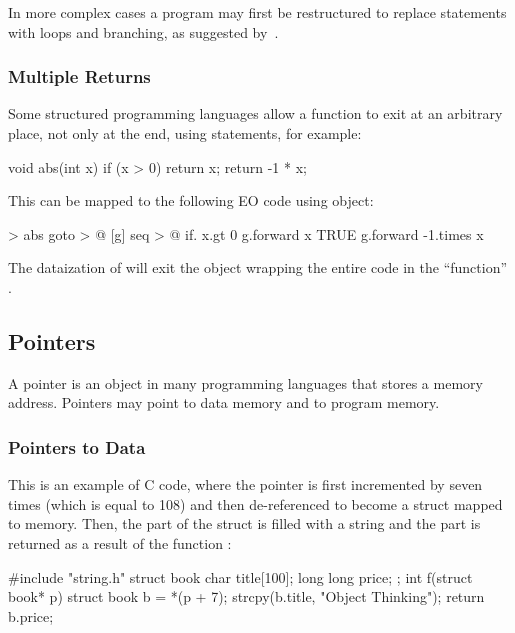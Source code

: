 \documentclass[sigplan,11pt,nonacm,natbib=false]{acmart}
\begin{document}
In more complex cases a program may first be restructured to replace  statements with loops and branching, as suggested by~\citet{williams1985restructuring,pan1996formal,erosa1994taming,ceccato2008goto}.

\subsubsection{Multiple Returns}

Some structured programming languages allow a function to exit at an arbitrary place, not only at the end, using  statements, for example:

\begin{ffcode}
void abs(int x) {
  if (x > 0) {
    return x;
  }
  return -1 * x;
}
\end{ffcode}

This can be mapped to the following EO code using  object:

\begin{ffcode}
[x] > abs
  goto > @
    [g]
      seq > @
        if.
          x.gt 0
          g.forward x
          TRUE
        g.forward
          -1.times x
\end{ffcode}

The dataization of  will exit the  object wrapping the entire code in the ``function'' .

\subsection{Pointers}
\label{sec:pointers}

A pointer is an object in many programming languages that stores a memory address. Pointers may point to data memory and to program memory.

\subsubsection{Pointers to Data}

This is an example of C code, where the pointer  is first incremented by seven times  (which is equal to 108) and then de-referenced to become a struct  mapped to memory. Then, the  part of the struct is filled with a string and the  part is returned as a result of the function :

\begin{ffcode}
#include "string.h"
struct book { 
  char title[100]; 
  long long price; 
};
int f(struct book* p) {
  struct book b = *(p + 7);
  strcpy(b.title, "Object Thinking");
  return b.price;
}
\end{ffcode}
\end{document}
